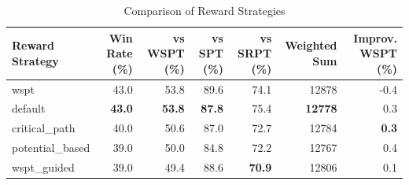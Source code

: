 \begin{table}[htbp]%
\centering%
\begin{tabular}{lrrrrrr}%
\toprule%
\textbf{Reward Strategy}&\textbf{Win Rate (\%)}&\textbf{vs WSPT (\%)}&\textbf{vs SPT (\%)}&\textbf{vs SRPT (\%)}&\textbf{Weighted Sum}&\textbf{Improv. WSPT (\%)}\\%
\midrule%
wspt&43.0&53.8&89.6&74.1&12878&-0.4\\%
default&\textbf{43.0}&\textbf{53.8}&\textbf{87.8}&75.4&\textbf{12778}&0.3\\%
critical_path&40.0&50.6&87.0&72.7&12784&\textbf{0.3}\\%
potential_based&39.0&50.0&84.8&72.2&12767&0.4\\%
wspt_guided&39.0&49.4&88.6&\textbf{70.9}&12806&0.1\\%
\bottomrule%
\end{tabular}%
\caption{Comparison of Reward Strategies}%
\label{tab:rewards}%
\end{table}